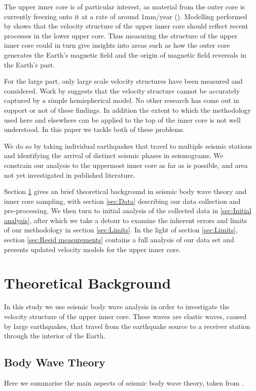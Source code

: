 \documentclass[11pt,a4paper]{article}
\begin{document}
The upper inner core is of particular interest, as material from the outer core is currently freezing onto it at a rate of around 1mm/year (\cite{Labrosse2001}). Modelling performed by \cite{Deguen2009a} shows that the velocity structure of the upper inner core should reflect recent processes in the lower upper core. Thus measuring the structure of the upper inner core could in turn give insights into areas such as how the outer core generates the Earth's magnetic field and the origin of magnetic field reversals in the Earth's past.

For the large part, only large scale velocity structures have been measured and considered. Work by \cite{Yee2014} suggests that the velocity structure cannot be accurately captured by a simple hemispherical model. No other research has come out in support or not of these findings. In addition the extent to which the methodology used here and elsewhere can be applied to the top of the inner core is not well understood. In this paper we tackle both of these problems.

We do so by taking individual earthquakes that travel to multiple seismic stations and identifying the arrival of distinct seismic phases in seismograms. We constrain our analysis to the uppermost inner core as far as is possible, and area not yet investigated in published literature.

Section \ref{sec:Theory} gives an brief theoretical background in seismic body wave theory and inner core sampling, with section \ref{sec:Data} describing our data collection and pre-processing. We then turn to initial analysis of the collected data in \ref{sec:Initial analysis}, after which we take a detour to examine the inherent errors and limits of our methodology in section \ref{sec:Limits}. In the light of section \ref{sec:Limits}, section \ref{sec:Resid measurements} contains a full analysis of our data set and presents updated velocity models for the upper inner core.

\section{Theoretical Background}
\label{sec:Theory}
In this study we use seismic body wave analysis in order to investigate the velocity structure of the upper inner core. These waves are elastic waves, caused by large earthquakes, that travel from the earthquake source to a receiver station through the interior of the Earth.

\subsection{Body Wave Theory}
Here we summarise the main aspects of seismic body wave theory, taken from \cite{Shearer2009}.
\end{document}
